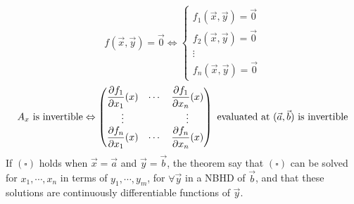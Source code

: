  \begin{remark}
    \begin{equation}\tag{ $ \square $ }
        f(\vec{x},\vec{y})=\vec{0}\Leftrightarrow \left\{
            \begin{matrix}
                f_1(\vec{x},\vec{y})=\vec{0}\\
                f_2(\vec{x},\vec{y})=\vec{0}\\
                \vdots \\
                f_n(\vec{x},\vec{y})=\vec{0}
            \end{matrix}
        \right.
    \end{equation}
    \begin{equation}\notag
        A_x \text{ is invertible}\Leftrightarrow
        \begin{pmatrix}
            \dfrac{\partial f_1}{\partial x_1} (x) & \cdots &
            \dfrac{\partial f_1}{\partial x_n} (x) \\
            \vdots & & \vdots \\
            \dfrac{\partial f_n}{\partial x_1} (x) & \cdots &
            \dfrac{\partial f_n}{\partial x_n} (x)
        \end{pmatrix} \text{ evaluated at  $ (\vec{a},\vec{b}) $ is invertible}
    \end{equation}
    If  $ (\square) $ holds when  $ \vec{x}=\vec{a} $ and  $ \vec{y}=\vec{b} $, the theorem say that  $ (\square )$  can be solved for  $ x_1,\cdots,x_n $ in terms of  $ y_1,\cdots,y_m $, for  $ \forall \vec{y}  $ in a NBHD of  $ \vec{b} $, and that these solutions are continuously differentiable functions of  $ \vec{y} $.   
 \end{remark}
